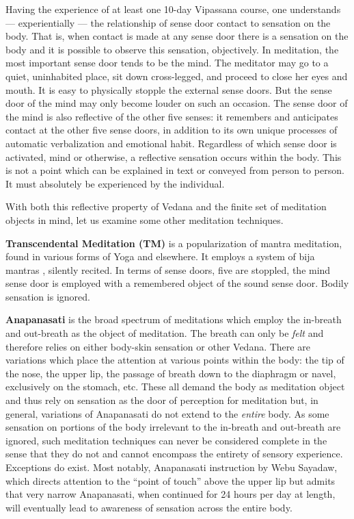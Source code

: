 \documentclass[a4paper, amsfonts, amssymb, amsmath, reprint, showkeys, nofootinbib, twoside]{revtex4-1}
\begin{document}
Having the experience of at least one 10-day Vipassana course, one understands ---
experientially --- the relationship of sense door contact to sensation on the
body. That is, when contact is made at any sense door there is a sensation on the
body and it is possible to observe this sensation, objectively. In meditation, the
most important sense door tends to be the mind. The meditator may go to a quiet,
uninhabited place, sit down cross-legged, and proceed to close her eyes and
mouth. It is easy to physically stopple the external sense doors. But the sense door
of the mind may only become louder on such an occasion. The sense door of the mind is
also reflective of the other five senses: it remembers and anticipates contact at the
other five sense doors, in addition to its own unique processes of automatic
verbalization and emotional habit. Regardless of which sense door is activated, mind
or otherwise, a reflective sensation occurs within the body. This is not a point
which can be explained in text or conveyed from person to person. It must absolutely
be experienced by the individual.

With both this reflective property of Vedana and the finite set of meditation
objects in mind, let us examine some other meditation techniques.

\textbf{Transcendental Meditation (TM)} is a popularization of mantra meditation,
found in various forms of Yoga and elsewhere. It employs a system of bija
mantras , silently recited. In terms of sense
doors, five are stoppled, the mind sense door is employed with a remembered object of
the sound sense door. Bodily sensation is ignored.

\textbf{Anapanasati} is the broad spectrum of meditations which employ the in-breath
and out-breath as the object of meditation. The breath can only be \textit{felt} and
therefore relies on either body-skin sensation or other Vedana. There are variations
which place the attention at various points within the body: the tip of the nose, the
upper lip, the passage of breath down to the diaphragm or navel, exclusively on
the stomach, etc. These all demand the body as meditation object and thus rely on
sensation as the door of perception for meditation but, in general, variations of
Anapanasati do not extend to the \textit{entire} body. As some sensation on portions
of the body irrelevant to the in-breath and out-breath are ignored, such meditation
techniques can never be considered complete in the sense that they do not and cannot
encompass the entirety of sensory experience. Exceptions do exist. Most notably,
Anapanasati instruction by Webu Sayadaw, which directs attention to the ``point of
touch'' above the upper lip but admits that very narrow Anapanasati, when continued
for 24 hours per day at length, will eventually lead to awareness of sensation across
the entire body.
\end{document}

